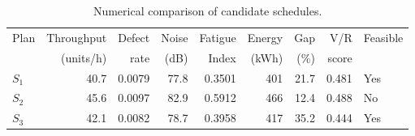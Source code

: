 \begin{table}[htbp]
\centering
\caption{Numerical comparison of candidate schedules.}
\label{tab:numerical-sim}
\small
\begin{tabular}{@{}lrrrrrrrl@{}}
\toprule
Plan & Throughput & Defect & Noise & Fatigue & Energy & Gap & V/R & Feasible \\
     & (units/h)  & rate   & (dB)  & Index   & (kWh)  & (\%) & score &         \\
\midrule
$S_{1}$ & 40.7 & 0.0079 & 77.8 & 0.3501 & 401 & 21.7 & 0.481 & Yes \\
$S_{2}$ & 45.6 & 0.0097 & 82.9 & 0.5912 & 466 & 12.4 & 0.488 & No \\
$S_{3}$ & 42.1 & 0.0082 & 78.7 & 0.3958 & 417 & 35.2 & 0.444 & Yes \\
\bottomrule
\end{tabular}
\end{table}
